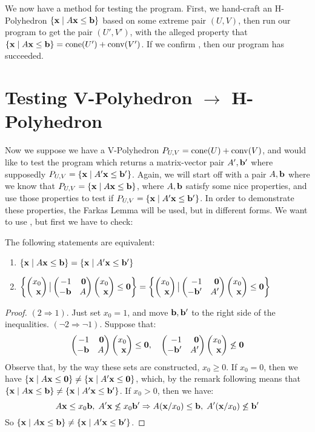 \begin{Test}\label{test_hp_to_vp}
	We now have a method for testing the program.  First, we hand-craft an H-Polyhedron $\left\{\mathbf{x}\;|\; A\mathbf{x}\leq \mathbf{b}\right\}$ based on some extreme pair $(U,V)$, then run our program to get the pair $(U',V')$, with the alleged property that $\left\{\mathbf{x}\;|\; A\mathbf{x}\leq \mathbf{b}\right\} = \operatorname{cone}(U') + \operatorname{conv}(V')$.  If we confirm , then our program has succeeded.
\end{Test}

\section{Testing V-Polyhedron $\to$ H-Polyhedron}
Now we suppose we have a V-Polyhedron $P_{U,V} = \operatorname{cone}(U) + \operatorname{conv}(V)$, and would like to test the program which returns a matrix-vector pair $A',\mathbf{b}'$ where supposedly $P_{U,V} = \left\{\mathbf{x}\;|\; A'\mathbf{x}\leq \mathbf{b}'\right\}$.  Again, we will start off with a pair $A,\mathbf{b}$ where we know that $P_{U,V} = \left\{\mathbf{x}\;|\; A\mathbf{x}\leq \mathbf{b}\right\}$, where $A,\mathbf{b}$ satisfy some nice properties, and use those properties to test if $P_{U,V} = \left\{\mathbf{x}\;|\; A'\mathbf{x}\leq \mathbf{b}'\right\}$.  In order to demonstrate these properties, the Farkas Lemma will be used, but in different forms.  We want to use , but first we have to check:

\begin{Prop}\label{homogenization_cone}
	The following statements are equivalent:
	\begin{enumerate}
		\item $\left\{\mathbf{x}\;|\; A\mathbf{x}\leq \mathbf{b}\right\} = \left\{\mathbf{x}\;|\; A'\mathbf{x}\leq \mathbf{b}'\right\}$
		\item $\set{\xx \big| \pmb -1 & \0 \\ -\b & A \pme \xx \leq \0} =
			      \set{\xx \big| \pmb -1 & \0 \\ -\b' & A' \pme \xx \leq \0}$
	\end{enumerate}
\end{Prop}

\begin{proof}
	$(2 \Rightarrow 1)$.  Just set $x_0 = 1$, and move $\mathbf{b},\mathbf{b}'$ to the right side of the inequalities.
	$(\neg 2 \Rightarrow \neg 1)$.  Suppose that:
	\[ \pmb -1 & \0 \\ -\b & A \pme \xx \leq \0,\quad
		\pmb -1 & \0 \\ -\b' & A' \pme \xx \not\leq \0 \]
	Observe that, by the way these sets are constructed, $x_0 \geq 0$.  If $x_0 = 0$, then we have $\left\{\mathbf{x}\;|\; A\mathbf{x}\leq\mathbf{0}\right\} \neq \left\{\mathbf{x}\;|\; A'\mathbf{x}\leq\mathbf{0}\right\}$, which, by the remark following  means that $\left\{\mathbf{x}\;|\; A\mathbf{x}\leq \mathbf{b}\right\} \neq \left\{\mathbf{x}\;|\; A'\mathbf{x}\leq \mathbf{b}'\right\}$.  If $x_0 > 0$, then we have:
	\[ A\mathbf{x} \leq x_0\mathbf{b},\;A'\mathbf{x}\not\leq x_0\mathbf{b}' \Rightarrow A(\mathbf{x}/x_0)\leq\mathbf{b},\;A'(\mathbf{x}/x_0)\not\leq\mathbf{b}' \]
	So $\left\{\mathbf{x}\;|\; A\mathbf{x}\leq \mathbf{b}\right\} \neq \left\{\mathbf{x}\;|\; A'\mathbf{x}\leq \mathbf{b}'\right\}$.
\end{proof}

